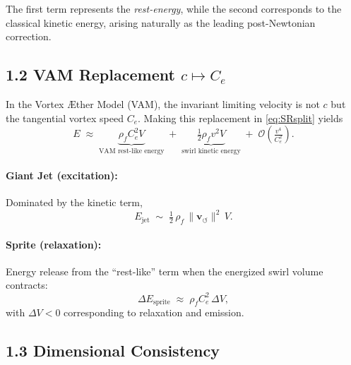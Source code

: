 \documentclass[11pt]{article}
\newcommand{\vnorm}{\lVert \mathbf{v}_{\!\boldsymbol{\circlearrowleft}}\rVert}
\newcommand{\rhof}{\rho_{\!f}}
\newcommand{\Ce}{C_{e}}
\begin{document}
        The first term represents the \emph{rest-energy},
        while the second corresponds to the classical kinetic energy,
        arising naturally as the leading post-Newtonian correction.

    \subsection*{1.2 VAM Replacement $c \mapsto \Ce$}

        In the Vortex \AE ther Model (VAM), the invariant limiting velocity
        is not $c$ but the tangential vortex speed $\Ce$. Making this
        replacement in \eqref{eq:SRsplit} yields
        \begin{equation}
        E \;\approx\;
        \underbrace{\rhof \Ce^2 V}_{\text{VAM rest-like energy}}
        \;+\;
        \underbrace{\tfrac{1}{2}\rhof v^2 V}_{\text{swirl kinetic energy}}
        \;+\;
        \mathcal{O}\!\left(\tfrac{v^4}{\Ce^2}\right).
        \label{eq:VAMsplit}
        \end{equation}

        \paragraph{Giant Jet (excitation):}
            Dominated by the kinetic term,
            \begin{equation}
            E_{\text{jet}}
            \;\sim\;
            \tfrac{1}{2}\,\rhof\,\vnorm^2\,V.
            \label{eq:jet}
            \end{equation}

        \paragraph{Sprite (relaxation):}
            Energy release from the ``rest-like'' term when the energized
            swirl volume contracts:
            \begin{equation}
            \Delta E_{\text{sprite}}
            \;\approx\;
            \rhof \Ce^2 \,\Delta V,
            \label{eq:sprite}
            \end{equation}
            with $\Delta V < 0$ corresponding to relaxation
            and emission.

\subsection*{1.3 Dimensional Consistency}
\end{document}
